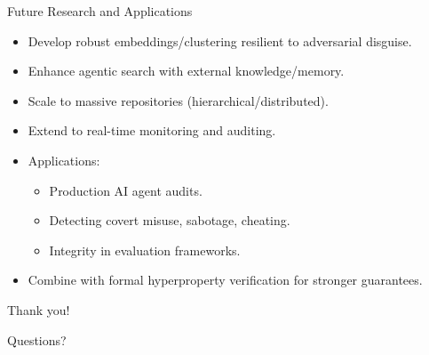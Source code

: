\documentclass{beamer}
\newcommand{\alertterm}[1]{\alert{#1}}
\begin{document}
\begin{frame}{Future Research and Applications}
\begin{itemize}
    \item Develop \alertterm{robust embeddings/clustering} resilient to adversarial disguise.
    \item Enhance \alertterm{agentic search} with external knowledge/memory.
    \item Scale to massive repositories (hierarchical/distributed).
    \item Extend to \alertterm{real-time} monitoring and auditing.
    \item Applications:
    \begin{itemize}
        \item Production AI agent audits.
        \item Detecting covert misuse, sabotage, cheating.
        \item Integrity in evaluation frameworks.
    \end{itemize}
    \item Combine with \alertterm{formal hyperproperty verification} for stronger guarantees.
\end{itemize}
\end{frame}

\begin{frame}
    \centering
    {\Huge Thank you!}
    
    \vspace{1cm}
    Questions?
\end{frame}
\end{document}
